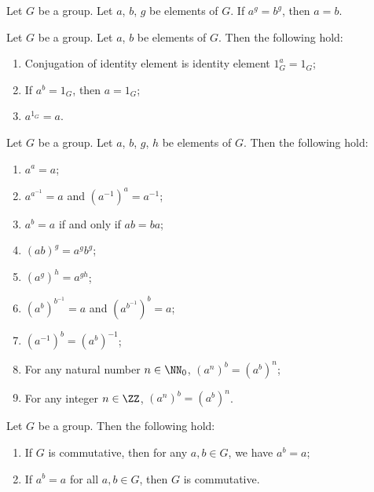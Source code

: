\begin{theorem}
Let $G$ be a group. Let $a$, $b$, $g$ be elements of $G$.
If $a^{g}=b^{g}$, then $a=b$.
\end{theorem}

\begin{theorem}
Let $G$ be a group. Let $a$, $b$ be elements of $G$. Then the
following hold:
\begin{enumerate}
\item{} Conjugation of identity element is identity element $1_{G}^{a}=1_{G}$;
\item{} If $a^{b}=1_{G}$, then $a=1_{G}$;
\item{} $a^{1_{G}}=a$.
\end{enumerate}
\end{theorem}

\begin{theorem}
Let $G$ be a group. Let $a$, $b$, $g$, $h$ be elements of $G$.
Then the following hold:
\begin{enumerate}
\item{} $a^{a}=a$;
\item{} $a^{a^{-1}}=a$ and $(a^{-1})^{a}=a^{-1}$;
\item{} $a^{b}=a$ if and only if $ab=ba$;
\item{} $(ab)^{g}=a^{g}b^{g}$;
\item{} $(a^{g})^{h}=a^{gh}$;
\item{} $(a^{b})^{b^{-1}}=a$ and $(a^{b^{-1}})^{b}=a$;
\item{} $(a^{-1})^{b}=(a^{b})^{-1}$;
\item{} For any natural number $n\in\NN_{0}$, $(a^{n})^{b}=(a^{b})^{n}$;
\item{} For any integer $n\in\ZZ$, $(a^{n})^{b}=(a^{b})^{n}$.
\end{enumerate}
\end{theorem}

\begin{theorem}
Let $G$ be a group. Then the following hold:
\begin{enumerate}
\item{} If $G$ is commutative, then for any $a,b\in G$, we have $a^{b}=a$;
\item{} If $a^{b}=a$ for all $a,b\in G$, then $G$ is commutative.
\end{enumerate}
\end{theorem}

